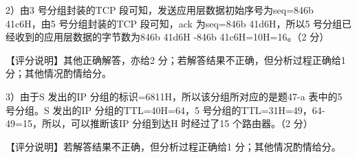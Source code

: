 \documentclass[UTF8,11pt]{ctexart}
\begin{document}
2）由3 号分组封装的TCP 段可知，发送应用层数据初始序号为seq=846b 41c6H，由5 号分组封装的TCP 段可知，ack 为seq=846b 41d6H，所以5 号分组已经收到的应用层数据的字节数为846b 41d6H -846b 41c6H=10H=16。（2 分）


【评分说明】其他正确解答，亦给2 分；若解答结果不正确，但分析过程正确给1 分；其他情况酌情给分。


3）由于S 发出的IP 分组的标识=6811H，所以该分组所对应的是题47-a 表中的5 号分组。S 发出的IP 分组的TTL=40H=64，5 号分组的TTL=31H=49，64-49=15，所以，可以推断该IP 分组到达H 时经过了15 个路由器。（2 分）


【评分说明】若解答结果不正确，但分析过程正确给1 分；其他情况酌情给分。
\end{document}
